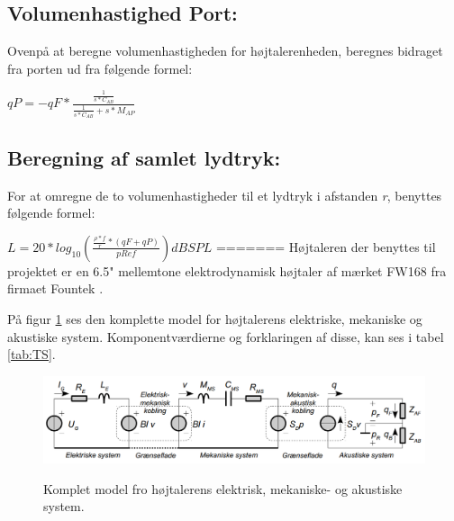 \subsection{Volumenhastighed Port:}

Ovenpå at beregne volumenhastigheden for højtalerenheden, beregnes bidraget fra porten ud fra følgende formel:

{\Large\(qP=-qF*\)}{\huge \(\frac{\frac{1}{s*C_{AB}}}{\frac{1}{s*C_{AB}}+s*M_{AP}}\) }


\subsection{Beregning af samlet lydtryk:}

For at omregne de to volumenhastigheder til et lydtryk i afstanden \textit{r}, benyttes følgende formel:

\(L=20*log_{10}(\frac{\frac{\rho*f}{r}*(qF+qP)}{pRef}) dB SPL\)
=======
Højtaleren der benyttes til projektet er en 6.5" mellemtone elektrodynamisk højtaler af mærket FW168\cite{FW168} fra firmaet Fountek \cite{Fountek}. 

På figur \ref{fig:kompletmodel} ses den komplette model for højtalerens elektriske, mekaniske og akustiske system.\citep{Elektroakustik} Komponentværdierne og forklaringen af disse, kan ses i tabel \ref{tab:TS}.

\begin{figure}[H]
	\centering
	\includegraphics[width=\textwidth]{Pics/kompletmodel.PNG}
	\label{fig:kompletmodel}
	\caption{Komplet model fro højtalerens elektrisk, mekaniske- og akustiske system. } 
\end{figure}

